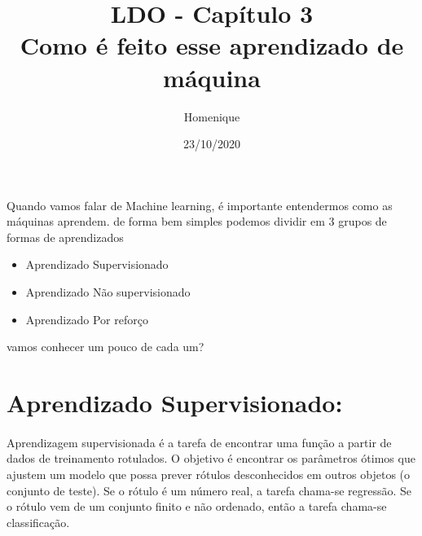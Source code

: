 \documentclass[12pt]{article}
\title{\textbf{LDO - Capítulo 3\\
Como é feito esse aprendizado de máquina}}
\author{Homenique}
\date{23/10/2020}
\begin{document}
    \maketitle

        Quando vamos falar de Machine learning, é importante entendermos como as máquinas aprendem. de forma bem simples podemos dividir em 3 grupos de formas de aprendizados 
        \begin{itemize}
            \item Aprendizado Supervisionado
            \item Aprendizado Não supervisionado
            \item Aprendizado Por reforço
          \end{itemize}
          vamos conhecer um pouco de cada um?

          \section{Aprendizado Supervisionado:}
            \paragraph{}Aprendizagem supervisionada é a tarefa de encontrar uma função a partir de dados de treinamento rotulados. O objetivo é encontrar os parâmetros ótimos que ajustem um modelo que possa prever rótulos desconhecidos em outros objetos (o conjunto de teste). Se o rótulo é um número real, a tarefa chama-se regressão. Se o rótulo vem de um conjunto finito e não ordenado, então a tarefa chama-se classificação.

  
\end{document}

